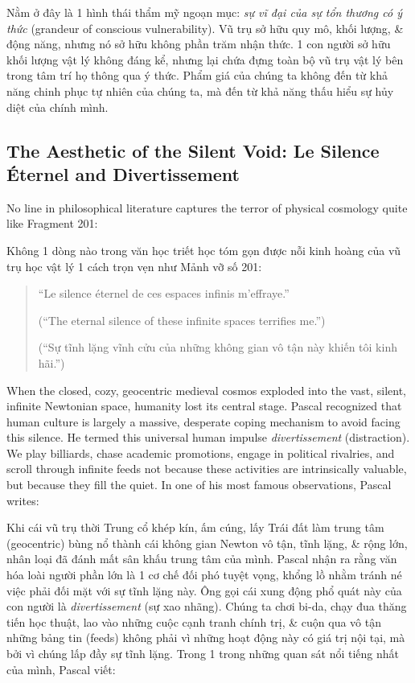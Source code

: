 \documentclass[11pt]{article}
\begin{document}
Nằm ở đây là 1 hình thái thẩm mỹ ngoạn mục: \emph{sự vĩ đại của sự tổn thương có ý thức} (grandeur of conscious vulnerability). Vũ trụ sở hữu quy mô, khối lượng, \& động năng, nhưng nó sở hữu không phần trăm nhận thức. 1 con người sở hữu khối lượng vật lý không đáng kể, nhưng lại chứa đựng toàn bộ vũ trụ vật lý bên trong tâm trí họ thông qua ý thức. Phẩm giá của chúng ta không đến từ khả năng chinh phục tự nhiên của chúng ta, mà đến từ khả năng thấu hiểu sự hủy diệt của chính mình.

\subsection{The Aesthetic of the Silent Void: Le Silence \'Eternel and Divertissement}
No line in philosophical literature captures the terror of physical cosmology quite like Fragment 201:

Không 1 dòng nào trong văn học triết học tóm gọn được nỗi kinh hoàng của vũ trụ học vật lý 1 cách trọn vẹn như Mảnh vỡ số 201:

\begin{quote}
``Le silence \'eternel de ces espaces infinis m'effraye.''

(``The eternal silence of these infinite spaces terrifies me.'')

(``Sự tĩnh lặng vĩnh cửu của những không gian vô tận này khiến tôi kinh hãi.'')
\end{quote}

When the closed, cozy, geocentric medieval cosmos exploded into the vast, silent, infinite Newtonian space, humanity lost its central stage. Pascal recognized that human culture is largely a massive, desperate coping mechanism to avoid facing this silence. He termed this universal human impulse \textit{divertissement} (distraction). We play billiards, chase academic promotions, engage in political rivalries, and scroll through infinite feeds not because these activities are intrinsically valuable, but because they fill the quiet. In one of his most famous observations, Pascal writes:

Khi cái vũ trụ thời Trung cổ khép kín, ấm cúng, lấy Trái đất làm trung tâm (geocentric) bùng nổ thành cái không gian Newton vô tận, tĩnh lặng, \& rộng lớn, nhân loại đã đánh mất sân khấu trung tâm của mình. Pascal nhận ra rằng văn hóa loài người phần lớn là 1 cơ chế đối phó tuyệt vọng, khổng lồ nhằm tránh né việc phải đối mặt với sự tĩnh lặng này. Ông gọi cái xung động phổ quát này của con người là \textit{divertissement} (sự xao nhãng). Chúng ta chơi bi-da, chạy đua thăng tiến học thuật, lao vào những cuộc cạnh tranh chính trị, \& cuộn qua vô tận những bảng tin (feeds) không phải vì những hoạt động này có giá trị nội tại, mà bởi vì chúng lấp đầy sự tĩnh lặng. Trong 1 trong những quan sát nổi tiếng nhất của mình, Pascal viết:
\end{document}
